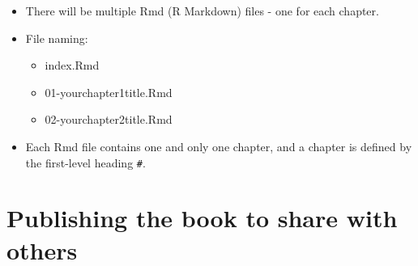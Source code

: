 \documentclass[
]{book}
\providecommand{\tightlist}{%
  \setlength{\itemsep}{0pt}\setlength{\parskip}{0pt}}
\begin{document}
\begin{itemize}
\tightlist
\item
  There will be multiple Rmd (R Markdown) files - one for each chapter.
\item
  File naming:

  \begin{itemize}
  \tightlist
  \item
    index.Rmd
  \item
    01-yourchapter1title.Rmd
  \item
    02-yourchapter2title.Rmd\\
  \end{itemize}
\item
  Each Rmd file contains one and only one chapter, and a chapter is defined by the first-level heading \texttt{\#}.
\end{itemize}

\hypertarget{publishing-the-book-to-share-with-others}{%
\section{Publishing the book to share with others}\label{publishing-the-book-to-share-with-others}}
\end{document}
